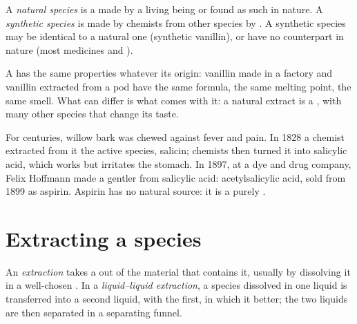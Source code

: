 \begin{definition}\label{def:g10:chemical-species:natural}
A \emph{natural species} is a 
made by a living being or found as such in nature. A \emph{synthetic
species} is made by chemists from other species
by . A synthetic species may be identical to a natural
one (synthetic vanillin), or have no counterpart in nature (most
medicines and ).
\end{definition}

\begin{proposition}\label{prop:g10:chemical-species:same}
A  has the same properties whatever its origin:
vanillin made in a factory and vanillin extracted from a pod have the same
formula, the same melting point, the same smell. What can differ is what
comes with it: a natural extract is a , with many other species
that change its taste.
\end{proposition}

\begin{history}
For centuries, willow bark was chewed against fever and pain. In 1828 a
chemist extracted from it the active species, salicin; chemists then
turned it into salicylic acid, which works but irritates the stomach. In
1897, at a dye and drug company, Felix Hoffmann made a gentler  from salicylic acid: acetylsalicylic acid, sold from 1899 as
aspirin. Aspirin has no natural source: it is a purely .
\end{history}

\section{Extracting a species}

\begin{definition}\label{def:g10:chemical-species:extraction}
An \emph{extraction} takes a  out of
the material that contains it, usually by dissolving it in a well-chosen
. In a \emph{liquid--liquid extraction},
a species dissolved in one liquid is transferred into a
second liquid,  with the first, in which it  better;
the two liquids are then separated in a separating funnel.
\end{definition}

